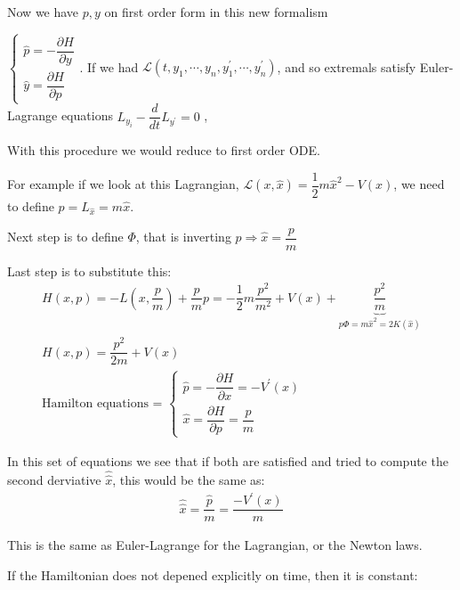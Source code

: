 \noindent Now we have $p,y$ on first order form in this new formalism\par
$
\begin{cases*}
  \hat{p} = -\dfrac{\partial H}{\partial y}\\
  \hat{y} = \dfrac{\partial H }{\partial  p}
\end{cases*}$. If we had $\mathcal{L}(t,y_1,\cdots,y_n, y_1^{\prime},\cdots,y_n^{\prime})$, and so extremals satisfy Euler-Lagrange equations $L_{y_i}-\dfrac{d}{dt}L_{y^{\prime}} = 0$ ,\par
\noindent With this procedure we would reduce to first order ODE. 
\par\bigskip
\noindent For example if we look at this Lagrangian, $\mathcal{L}(x,\hat{x}) = \dfrac{1}{2}m\hat{x}^2-V(x)$, we need to define $p = L_{\hat{x}} = m\hat{x}$.\par
\noindent Next step is to define $\Phi$, that is inverting $p\Rightarrow \hat{x} = \dfrac{p}{m}$\par
\noindent Last step is to substitute this:
\begin{equation*}
  \begin{gathered}
    H(x,p) = -L\left(x, \dfrac{p}{m}\right) + \dfrac{p}{m}p = -\dfrac{1}{2}m\dfrac{p^2}{m^2}+V(x)+\underbrace{\dfrac{p^2}{m}}_{\text{$p\Phi=m\hat{x}^2=2K(\hat{x})$}}\\
    H(x,p )= \dfrac{p^2}{2m}+V(x)\\
    \text{Hamilton equations = }
    \begin{cases*}
      \hat{p} = -\dfrac{\partial H}{\partial x} = -V^{\prime}(x)\\
      \hat{x} = \dfrac{\partial  H }{\partial  p} = \dfrac{p}{m}
    \end{cases*}
  \end{gathered}
\end{equation*}\par
\noindent In this set of equations we see that if both are satisfied and tried to compute the second derviative $\hat{\hat{x}}$, this would be the same as:
\begin{equation*}
  \begin{gathered}
    \hat{\hat{x}} = \dfrac{\hat{p}}{m} = \dfrac{-V^{\prime}(x)}{m}
  \end{gathered}
\end{equation*}\par
\noindent This is the same as Euler-Lagrange for the Lagrangian, or the Newton laws.
\par\bigskip
\noindent If the Hamiltonian does not depened explicitly on time, then it is constant:

